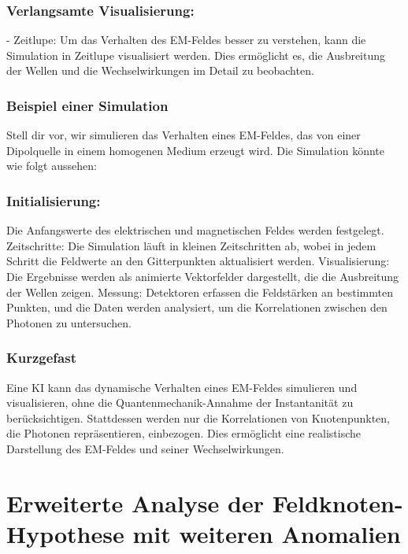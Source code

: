 \documentclass[12pt,a4paper]{article}
\begin{document}
	\subsubsection{	Verlangsamte Visualisierung:}
	- Zeitlupe: Um das Verhalten des EM-Feldes besser zu verstehen, kann die Simulation in Zeitlupe visualisiert werden. Dies ermöglicht es, die Ausbreitung der Wellen und die Wechselwirkungen im Detail zu beobachten.
	
	\subsubsection{	Beispiel einer Simulation}
	
	Stell dir vor, wir simulieren das Verhalten eines EM-Feldes, das von einer Dipolquelle in einem homogenen Medium erzeugt wird. Die Simulation könnte wie folgt aussehen:
	
	\subsubsection{	Initialisierung:} Die Anfangswerte des elektrischen und magnetischen Feldes werden festgelegt.
	Zeitschritte: Die Simulation läuft in kleinen Zeitschritten ab, wobei in jedem Schritt die Feldwerte an den Gitterpunkten aktualisiert werden.
	Visualisierung: Die Ergebnisse werden als animierte Vektorfelder dargestellt, die die Ausbreitung der Wellen zeigen.
	Messung: Detektoren erfassen die Feldstärken an bestimmten Punkten, und die Daten werden analysiert, um die Korrelationen zwischen den Photonen zu untersuchen.
	
	\subsubsection{	Kurzgefast}
	
	Eine KI kann das dynamische Verhalten eines EM-Feldes simulieren und visualisieren, ohne die Quantenmechanik-Annahme der Instantanität zu berücksichtigen. Stattdessen werden nur die Korrelationen von Knotenpunkten, die Photonen repräsentieren, einbezogen. Dies ermöglicht eine realistische Darstellung des EM-Feldes und seiner Wechselwirkungen.
	
	
	
	\section{Erweiterte Analyse der Feldknoten-Hypothese mit weiteren Anomalien}
	
\end{document}
